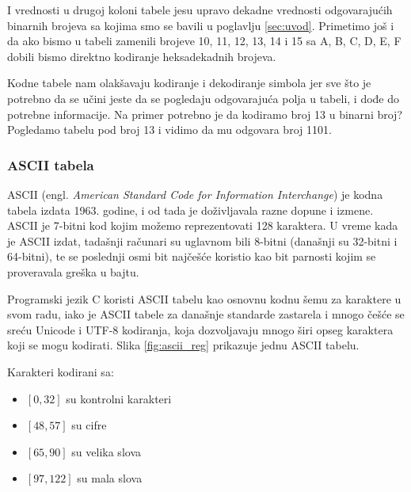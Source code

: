 \documentclass[a4paper]{article}
\begin{document}
I vrednosti u drugoj koloni tabele jesu upravo dekadne vrednosti odgovarajućih binarnih brojeva sa kojima smo se bavili u poglavlju \ref{sec:uvod}. 
Primetimo još i da ako bismo u tabeli zamenili brojeve 10, 11, 12, 13, 14 i 15 sa A, B, C, D, E, F dobili bismo direktno kodiranje heksadekadnih brojeva.

Kodne tabele nam olakšavaju kodiranje i dekodiranje simbola jer sve što je potrebno da se učini jeste da se pogledaju odgovarajuća polja u tabeli, i dođe do potrebne informacije. 
Na primer potrebno je da kodiramo broj 13 u binarni broj? Pogledamo tabelu pod broj 13 i vidimo da mu odgovara broj 1101.

\subsubsection{ASCII tabela}
ASCII (engl. \emph{American Standard Code for Information Interchange}) je kodna tabela izdata 1963. godine, i od tada je doživljavala razne dopune i izmene. ASCII je 7-bitni kod kojim 
možemo reprezentovati 128 karaktera. U vreme kada je ASCII izdat, tadašnji računari su uglavnom bili 8-bitni (današnji su 32-bitni i 64-bitni), te se poslednji osmi bit najčešće koristio kao bit parnosti
kojim se proveravala greška u bajtu.

Programski jezik C koristi ASCII tabelu kao osnovnu kodnu šemu za karaktere u svom radu, iako je ASCII tabele za današnje standarde zastarela i mnogo češće se sreću Unicode i UTF-8 kodiranja, koja
dozvoljavaju mnogo širi opseg karaktera koji se mogu kodirati. Slika \ref{fig:ascii_reg} prikazuje jednu ASCII tabelu.

Karakteri kodirani sa:
\begin{itemize}
 \item $[0, 32]$ su kontrolni karakteri
 \item $[48, 57]$ su cifre
 \item $[65, 90]$ su velika slova
 \item $[97, 122]$ su mala slova
\end{itemize}
\end{document}
